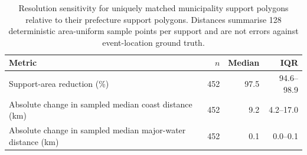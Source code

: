 \begin{table}[t]
\centering
\caption{Resolution sensitivity for uniquely matched municipality support polygons relative to their prefecture support polygons. Distances summarise 128 deterministic area-uniform sample points per support and are not errors against event-location ground truth.}
\label{tab:resolution}
\small
\begin{tabular}{p{}rrr}
\toprule
Metric & $n$ & Median & IQR \\
\midrule
Support-area reduction (\%) & 452 & 97.5 & 94.6--98.9 \\
Absolute change in sampled median coast distance (km) & 452 & 9.2 & 4.2--17.0 \\
Absolute change in sampled median major-water distance (km) & 452 & 0.1 & 0.0--0.1 \\
\bottomrule
\end{tabular}
\end{table}
